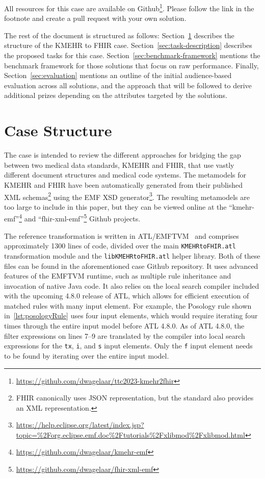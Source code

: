 \documentclass[a4paper]{scrartcl}
\begin{document}
All resources for this case are available on
Github\footnote{\url{https://github.com/dwagelaar/ttc2023-kmehr2fhir}}.
Please follow the link in the footnote and create a pull request with your own
solution.

The rest of the document is structured as follows:
Section~\ref{sec:case-structure} describes the structure of the KMEHR to FHIR 
case. Section~\ref{sec:task-description} describes the proposed tasks for this
case. Section~\ref{sec:benchmark-framework} mentions the benchmark framework for
those solutions that focus on raw performance. Finally,
Section~\ref{sec:evaluation} mentions an outline of the initial audience-based
evaluation across all solutions, and the approach that will be followed to
derive additional prizes depending on the attributes targeted by the solutions.

\section{Case Structure}
\label{sec:case-structure}

The case is intended to review the different approaches for bridging the gap
between two medical data standards, KMEHR and FHIR, that use vastly different
document structures and medical code systems. The metamodels for
KMEHR and FHIR have been automatically generated from their published XML 
schemas\footnote{FHIR canonically uses JSON
representation, but the standard also provides an XML representation.}
using the EMF XSD generator\footnote{\url{https://help.eclipse.org/latest/index.jsp?topic=\%2Forg.eclipse.emf.doc\%2Ftutorials\%2Fxlibmod\%2Fxlibmod.html}}. The
resulting metamodels are too large to include in this paper, but they can
be viewed online at the
``kmehr-emf''\footnote{\url{https://github.com/dwagelaar/kmehr-emf}} and
``fhir-xml-emf''\footnote{\url{https://github.com/dwagelaar/fhir-xml-emf}}
Github projects.

The reference transformation is written in ATL/EMFTVM~\cite{conf/models/Wagelaar2011}
and comprises approximately 1300 lines of code, divided over the main \texttt{KMEHRtoFHIR.atl}
transformation module and the \texttt{libKMEHRtoFHIR.atl} helper library. Both
of these files can be found in the aforementioned case Github repository. It uses
advanced features of the EMFTVM runtime, such as multiple rule inheritance and
invocation of native Java code. It also relies on the local search compiler
included with the upcoming 4.8.0 release of ATL, which allows for efficient
execution of matched rules with many input element. For example, the Posology
rule shown in~\ref{lst:posologyRule} uses four input elements, which would
require iterating four times through the entire input model before ATL 4.8.0.
As of ATL 4.8.0, the filter expressions on lines 7--9 are translated by the compiler
into local search expressions for the \texttt{tx}, \texttt{i}, and \texttt{s} input
elements. Only the \texttt{f} input element needs to be found by iterating over
the entire input model.
\end{document}
